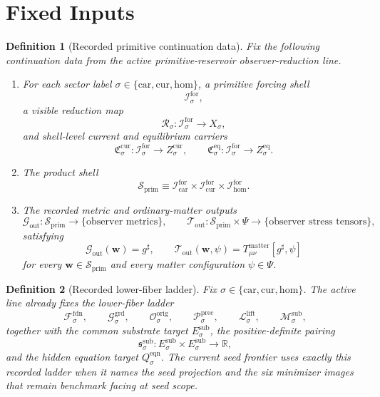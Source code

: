 \documentclass[11pt]{article}
\newcommand{\CompletedMetric}{g^{\sharp}}
\newcommand{\MatterSpace}{\Psi}
\newcommand{\Car}{\mathrm{car}}
\newcommand{\Cur}{\mathrm{cur}}
\newcommand{\Hom}{\mathrm{hom}}
\newcommand{\ForSpace}[1]{\mathcal I_{#1}^{\mathrm{for}}}
\newcommand{\PrimShell}{\mathcal S_{\mathrm{prim}}}
\newcommand{\Reduction}[1]{\mathcal R_{#1}}
\newcommand{\CurrentCarrier}[1]{\mathfrak C_{#1}^{\mathrm{cur}}}
\newcommand{\EqCarrier}[1]{\mathfrak C_{#1}^{\mathrm{eq}}}
\newcommand{\MetricOut}{\mathscr G_{\mathrm{out}}}
\newcommand{\MatterOut}{\mathscr T_{\mathrm{out}}}
\newcommand{\FoundSpace}[1]{\mathcal F_{#1}^{\mathrm{fdn}}}
\newcommand{\GroundSpace}[1]{\mathcal G_{#1}^{\mathrm{grd}}}
\newcommand{\OrigSpace}[1]{\mathcal O_{#1}^{\mathrm{orig}}}
\newcommand{\PrecSpace}[1]{\mathcal P_{#1}^{\mathrm{prec}}}
\newcommand{\LiftSpace}[1]{\mathcal L_{#1}^{\mathrm{lift}}}
\newcommand{\SubSpace}[1]{\mathcal M_{#1}^{\mathrm{sub}}}
\newcommand{\SubTarget}[1]{E_{#1}^{\mathrm{sub}}}
\newcommand{\SubPair}[1]{\mathfrak s_{#1}^{\mathrm{sub}}}
\newcommand{\EqnTarget}[1]{Q_{#1}^{\mathrm{eqn}}}
\newtheorem{definition}{Definition}
\begin{document}
\section{Fixed Inputs}

\begin{definition}[Recorded primitive continuation data]
\label{def:fixed}
Fix the following continuation data from the active primitive-reservoir observer-reduction line.
\begin{enumerate}
    \item For each sector label \(\sigma\in\{\Car,\Cur,\Hom\}\), a primitive forcing shell
    \[
    \ForSpace{\sigma},
    \]
    a visible reduction map
    \[
    \Reduction{\sigma}:\ForSpace{\sigma}\to X_{\sigma},
    \]
    and shell-level current and equilibrium carriers
    \[
    \CurrentCarrier{\sigma}:\ForSpace{\sigma}\to Z_{\sigma}^{\mathrm{cur}},
    \qquad
    \EqCarrier{\sigma}:\ForSpace{\sigma}\to Z_{\sigma}^{\mathrm{eq}}.
    \]
    \item The product shell
    \[
    \PrimShell
    \equiv
    \ForSpace{\Car}\times \ForSpace{\Cur}\times \ForSpace{\Hom}.
    \]
    \item The recorded metric and ordinary-matter outputs
    \[
    \MetricOut:\PrimShell\to\{\text{observer metrics}\},
    \qquad
    \MatterOut:\PrimShell\times\MatterSpace\to\{\text{observer stress tensors}\},
    \]
    satisfying
    \begin{equation}
    \MetricOut(\mathbf w)=\CompletedMetric,
    \qquad
    \MatterOut(\mathbf w,\psi)
    =
    T_{\mu\nu}^{\mathrm{matter}}[\CompletedMetric,\psi]
    \label{eq:fixedoutputs}
    \end{equation}
    for every \(\mathbf w\in\PrimShell\) and every matter configuration \(\psi\in\MatterSpace\).
\end{enumerate}
\end{definition}

\begin{definition}[Recorded lower-fiber ladder]
\label{def:ladder}
Fix \(\sigma\in\{\Car,\Cur,\Hom\}\). The active line already fixes the lower-fiber ladder
\[
\FoundSpace{\sigma},
\qquad
\GroundSpace{\sigma},
\qquad
\OrigSpace{\sigma},
\qquad
\PrecSpace{\sigma},
\qquad
\LiftSpace{\sigma},
\qquad
\SubSpace{\sigma},
\]
together with the common substrate target \(\SubTarget{\sigma}\), the positive-definite pairing
\[
\SubPair{\sigma}:
\SubTarget{\sigma}\times\SubTarget{\sigma}\to\mathbb R,
\]
and the hidden equation target \(\EqnTarget{\sigma}\). The current seed frontier uses exactly this recorded ladder when it names the seed projection and the six minimizer images that remain benchmark facing at seed scope.
\end{definition}
\end{document}
